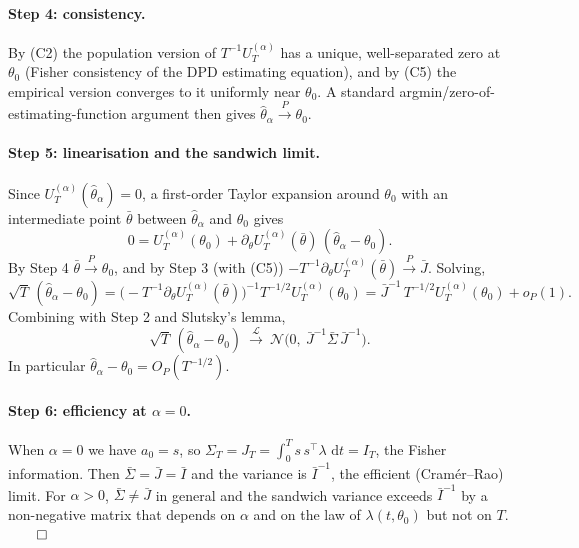 \documentclass[smallextended,natbib]{svjour3}
\newcommand{\dd}{\,\mathrm{d}}
\newcommand{\toP}{\xrightarrow{P}}
\newcommand{\toL}{\xrightarrow{\mathcal{L}}}
\begin{document}
\paragraph{Step 4: consistency.}
By (C2) the population version of $T^{-1}U_T^{(\alpha)}$ has a unique, well-separated
zero at $\theta_0$ (Fisher consistency of the DPD estimating equation), and by (C5)
the empirical version converges to it uniformly near $\theta_0$. A standard
argmin/zero-of-estimating-function argument then gives $\hat\theta_\alpha\toP\theta_0$.

\paragraph{Step 5: linearisation and the sandwich limit.}
Since $U_T^{(\alpha)}(\hat\theta_\alpha)=0$, a first-order Taylor expansion around
$\theta_0$ with an intermediate point $\bar\theta$ between $\hat\theta_\alpha$ and
$\theta_0$ gives
\[
0=U_T^{(\alpha)}(\theta_0)+\partial_\theta U_T^{(\alpha)}(\bar\theta)\,(\hat\theta_\alpha-\theta_0).
\]
By Step 4 $\bar\theta\toP\theta_0$, and by Step 3 (with (C5))
$-T^{-1}\partial_\theta U_T^{(\alpha)}(\bar\theta)\toP\bar J$. Solving,
\[
\sqrt T\,(\hat\theta_\alpha-\theta_0)
=\Big(-T^{-1}\partial_\theta U_T^{(\alpha)}(\bar\theta)\Big)^{-1}
T^{-1/2}U_T^{(\alpha)}(\theta_0)
=\bar J^{-1}\,T^{-1/2}U_T^{(\alpha)}(\theta_0)+o_P(1).
\]
Combining with Step 2 and Slutsky's lemma,
\[
\sqrt T\,(\hat\theta_\alpha-\theta_0)\ \toL\ \mathcal N\!\big(0,\ \bar J^{-1}\bar\Sigma\,\bar J^{-1}\big).
\]
In particular $\hat\theta_\alpha-\theta_0=O_P(T^{-1/2})$.

\paragraph{Step 6: efficiency at $\alpha=0$.}
When $\alpha=0$ we have $a_0=s$, so $\Sigma_T=J_T=\int_0^T s\,s^{\top}\lambda\,\dd t=I_T$,
the Fisher information. Then $\bar\Sigma=\bar J=\bar I$ and the variance is
$\bar I^{-1}$, the efficient (Cram\'er--Rao) limit. For $\alpha>0$, $\bar\Sigma\neq\bar J$
in general and the sandwich variance exceeds $\bar I^{-1}$ by a non-negative matrix
that depends on $\alpha$ and on the law of $\lambda(t,\theta_0)$ but not on $T$. $\qed$
\end{document}
